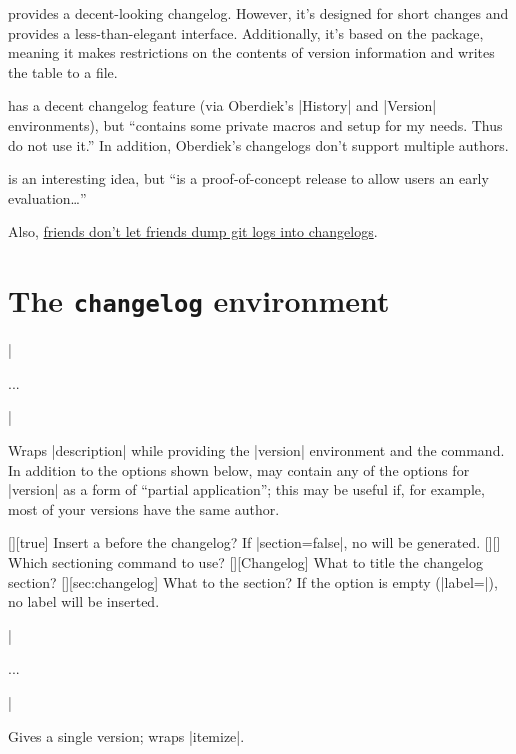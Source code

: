 \documentclass{ltxguidex}
\begin{document}
\begin{ctandescription}
	 provides a decent-looking changelog. However, it's
		designed for short changes and provides a less-than-elegant
		interface. Additionally, it's based on the 
		package, meaning it makes restrictions on the contents of
		version information and writes the table to a file.

	 has a decent changelog feature (via
		Oberdiek's |History| and |Version| environments),
		but  ``contains some private macros and setup
		for my needs. Thus do not use it.'' In addition, Oberdiek's
		changelogs don't support multiple authors.

	 is an interesting idea, but  ``is a
		proof-of-concept release to allow users an early
		evaluation\dots''

		Also,
		\href{https://keepachangelog.com/en/1.0.0/}{friends don't
		let friends dump git logs into changelogs}.
\end{ctandescription}

\section{The \texttt{changelog} environment}

\begin{desc}
|\begin{changelog}[<options>]...\end{changelog}|
\end{desc}
Wraps |description| while providing the |version| environment and the
 command. In addition to the options shown below,
 may contain any of the options for |version| as a form of
``partial application''; this may be useful if, for example, most of your
versions have the same author.

\begin{keys}
	[\bool][true]
		Insert a  before the changelog?
		If |section=false|, no  will be generated.
	[][]
		Which sectioning command to use?
	[][Changelog]
		What to title the changelog section?
	[][sec:changelog]
		What to  the section?
		If the  option is empty (|label=|), no label will be
		inserted.
\end{keys}

\pagebreak
\begin{desc}
|\begin{version}[<options>]...\end{version}|
\end{desc}
Gives a single version; wraps |itemize|.
\end{document}
